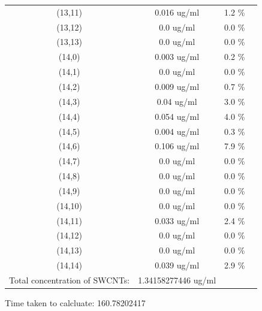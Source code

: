 \documentclass{article}
\begin{document}
\begin{tabular}{c c c c}
(13,11)&        0.016 ug/ml        &1.2 \%\\
(13,12)&        0.0 ug/ml        &0.0 \%\\
(13,13)&        0.0 ug/ml        &0.0 \%\\
(14,0)&        0.003 ug/ml        &0.2 \%\\
(14,1)&        0.0 ug/ml        &0.0 \%\\
(14,2)&        0.009 ug/ml        &0.7 \%\\
(14,3)&        0.04 ug/ml        &3.0 \%\\
(14,4)&        0.054 ug/ml        &4.0 \%\\
(14,5)&        0.004 ug/ml        &0.3 \%\\
(14,6)&        0.106 ug/ml        &7.9 \%\\
(14,7)&        0.0 ug/ml        &0.0 \%\\
(14,8)&        0.0 ug/ml        &0.0 \%\\
(14,9)&        0.0 ug/ml        &0.0 \%\\
(14,10)&        0.0 ug/ml        &0.0 \%\\
(14,11)&        0.033 ug/ml        &2.4 \%\\
(14,12)&        0.0 ug/ml        &0.0 \%\\
(14,13)&        0.0 ug/ml        &0.0 \%\\
(14,14)&        0.039 ug/ml        &2.9 \%\\
Total concentration of SWCNTs: &1.34158277446 ug/ml\\

\end{tabular}Time taken to calcluate: 160.78202417
\end{document}
